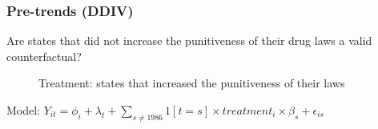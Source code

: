 \documentclass{beamer}
\begin{document}
\begin{frame}
\frametitle{Pre-trends (DDIV)}
Are states that did not increase the punitiveness of their drug laws a valid counterfactual?
\begin{figure}%
    \centering
    \qquad
    \caption{Treatment: states that increased the punitiveness of their laws}%
    \label{fig:example}%
\end{figure}

Model: $Y_{it}=\phi_{i}+\lambda_{t}+\sum_{s\neq1986}1[t=s]\times treatment_{i}\times\beta_{s}+\epsilon_{is}$

\end{frame}

\end{document}
